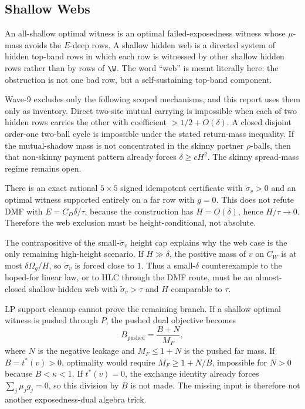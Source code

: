 \subsection{Shallow Webs}

An all-shallow optimal witness is an optimal failed-exposedness witness whose
\(\mu\)-mass avoids the \(E\)-deep rows.  A shallow hidden web is a directed
system of hidden top-band rows in which each row is witnessed by other
shallow hidden rows rather than by rows of \(\W\).  The word ``web'' is meant
literally here: the obstruction is not one bad row, but a self-sustaining
top-band component.

\begin{proposition}
\modauditbadge
Wave-9 excludes only the following scoped mechanisms, and this report uses them
only as inventory.  Direct two-site mutual carrying is impossible when each of
two hidden rows carries the other with coefficient \(>1/2+O(\delta)\).  A
closed disjoint order-one two-ball cycle is impossible under the stated
return-mass inequality.  If the mutual-shadow mass is not concentrated in the
skinny partner \(\rho\)-balls, then that non-skinny payment pattern already
forces \(\delta\ge cH^2\).  The skinny spread-mass regime remains open.
\end{proposition}

\begin{proposition}
\modauditbadge
There is an exact rational \(5\times5\) signed idempotent certificate with
\(\widetilde\sigma_v>0\) and an optimal witness supported entirely on a far
row with \(g=0\).  This does not refute DMF with \(E=C_D\delta/\tau\), because
the construction has \(H=O(\delta)\), hence \(H/\tau\to0\).  Therefore the
web exclusion must be height-conditional, not absolute.
\end{proposition}

The contrapositive of the small-\(\widetilde\sigma_v\) height cap explains
why the web case is the only remaining high-height scenario.  If
\(H\gg\delta\), the positive mass of \(v\) on \(C_W\) is at most
\(\delta\Omega_g/H\), so \(\widetilde\sigma_v\) is forced close to \(1\).
Thus a small-\(\delta\) counterexample to the hoped-for linear law, or to HLC
through the DMF route, must be an almost-closed shallow hidden web with
\(\widetilde\sigma_v>\tau\) and \(H\) comparable to \(\tau\).

\begin{warning}
\provedbadge
LP support cleanup cannot prove the remaining branch.  If a shallow optimal
witness is pushed through \(P\), the pushed dual objective becomes
\[
  B_{\mathrm{pushed}}=\frac{B+N}{M_F},
\]
where \(N\) is the negative leakage and \(M_F\le1+N\) is the pushed far mass.
If \(B=t^*(v)>0\), optimality would require \(M_F\ge1+N/B\), impossible for
\(N>0\) because \(B<\kappa<1\).  If \(t^*(v)=0\), the exchange identity
already forces \(\sum_j\mu_jg_j=0\), so this division by \(B\) is not made.
The missing input is therefore not another exposedness-dual algebra trick.
\end{warning}

